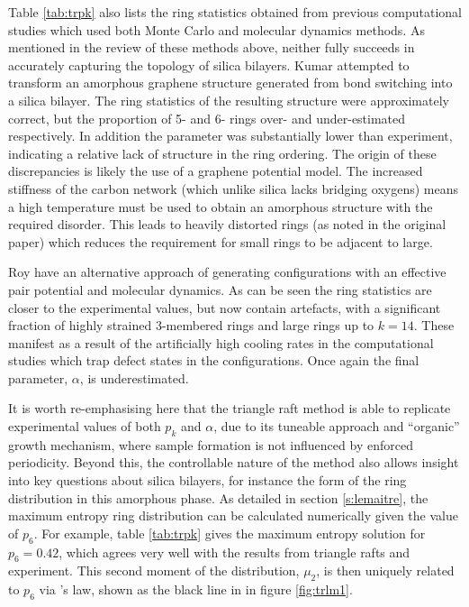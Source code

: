 Table \ref{tab:trpk} also lists the ring statistics obtained from previous computational studies which used both Monte Carlo and molecular dynamics methods. 
As mentioned in the review of these methods above, neither fully succeeds in accurately capturing the topology of silica bilayers.
Kumar \etal{} attempted to transform an amorphous graphene structure generated from bond switching \mc{} into a silica bilayer.
The ring statistics of the resulting structure were approximately correct, but the proportion of 5\-- and 6\-- rings over\-- and under\--estimated respectively.
In addition the \aw{} parameter was substantially lower than experiment, indicating a relative lack of structure in the ring ordering.
The origin of these discrepancies is likely the use of a graphene potential model.
The increased stiffness of the carbon network (which unlike silica lacks bridging oxygens) means a high temperature must be used to obtain an amorphous structure with the required disorder.
This leads to heavily distorted rings (as noted in the original paper) which reduces the requirement for small rings to be adjacent to large.

Roy \etal{} have an alternative approach of generating configurations with an effective pair potential and molecular dynamics.
As can be seen the ring statistics are closer to the experimental values, but now contain artefacts, with a significant fraction of highly strained 3\--membered rings and large rings up to $k=14$.
These manifest as a result of the artificially high cooling rates in the computational studies which trap defect states in the configurations. 
Once again the final \aw{} parameter, $\alpha$, is underestimated.

It is worth re\--emphasising here that the triangle raft method is able to replicate experimental values of both $p_k$ and $\alpha$, due to its tuneable approach and ``organic'' growth mechanism, where sample formation is not influenced by enforced periodicity. 
Beyond this, the controllable nature of the method also allows insight into key questions about silica bilayers, for instance the form of the ring distribution in this amorphous phase. 
As detailed in section \ref{s:lemaitre}, the maximum entropy ring distribution can be calculated numerically given the value of $p_6$.
For example, table \ref{tab:trpk} gives the maximum entropy solution for $p_6=0.42$, which agrees very well with the results from triangle rafts and experiment.
This second moment of the distribution, $\mu_2$, is then uniquely related to $p_6$ via \lm's law, shown as the black line in in figure \ref{fig:trlm1}.


